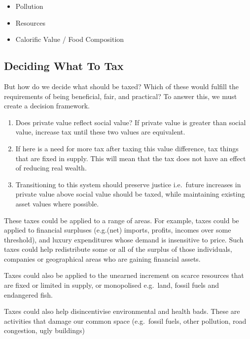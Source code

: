 \documentclass[]{tufte-handout}
\providecommand{\tightlist}{%
  \setlength{\itemsep}{0pt}\setlength{\parskip}{0pt}}
\begin{document}
\begin{itemize}
\tightlist
\item
  Pollution
\item
  Resources
\item
  Calorific Value / Food Composition
\end{itemize}

\hypertarget{deciding-what-to-tax}{%
\subsection{Deciding What To Tax}\label{deciding-what-to-tax}}

But how do we decide what should be taxed? Which of these would fulfill
the requirements of being beneficial, fair, and practical? To answer
this, we must create a decision framework.

\begin{enumerate}
\def\labelenumi{\arabic{enumi}.}
\tightlist
\item
  Does private value reflect social value? If private value is greater
  than social value, increase tax until these two values are equivalent.
\item
  If here is a need for more tax after taxing this value difference, tax
  things that are fixed in supply. This will mean that the tax does not
  have an effect of reducing real wealth.
\item
  Transitioning to this system should preserve justice i.e.~future
  increases in private value above social value should be taxed, while
  maintaining existing asset values where possible.
\end{enumerate}

These taxes could be applied to a range of areas. For example, taxes
could be applied to financial surpluses (e.g.(net) imports, profits,
incomes over some threshold), and luxury expenditures whose demand is
insensitive to price. Such taxes could help redistribute some or all of
the surplus of those individuals, companies or geographical areas who
are gaining financial assets.

Taxes could also be applied to the unearned increment on scarce
resources that are fixed or limited in supply, or monopolised e.g.~land,
fossil fuels and endangered fish.

Taxes could also help disincentivise environmental and health bads.
These are activities that damage our common space (e.g.~fossil fuels,
other pollution, road congestion, ugly buildings)
\end{document}

